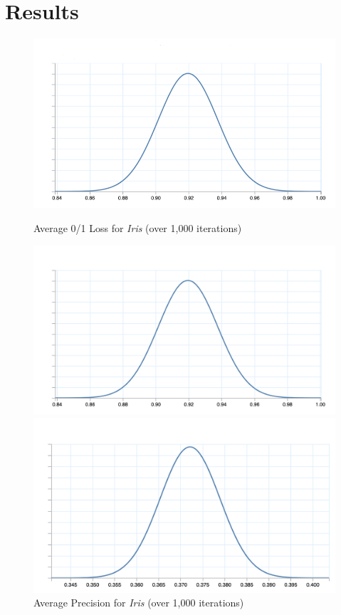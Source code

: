 \documentclass[twoside,11pt]{article}
\begin{document}
\section{Results}
\begin{figure}[!hbp] %
    \centering
    \begin{minipage}[b]{0.7\textwidth}
      \includegraphics[width=\textwidth]{01_loss_graph.png}
      \caption{Average 0/1 Loss for \emph{Iris} (over 1,000 iterations)}
    \end{minipage}
    \hfill
    \begin{minipage}[b]{0.4\textwidth}
      \includegraphics[width=\textwidth]{precision_graph.png}
      \caption{Average Precision for \emph{Iris} (over 1,000 iterations)}
    \end{minipage}
    \hfill
    \begin{minipage}[b]{0.4\textwidth}
        \includegraphics[width=\textwidth]{recall_graph.png}

\end{minipage}
\end{figure}
\end{document}
